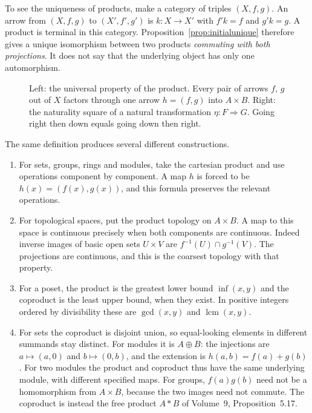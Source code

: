 To see the uniqueness of products, make a category of triples $(X,f,g)$. An arrow from $(X,f,g)$ to $(X',f',g')$ is $k:X\to X'$ with $f'k=f$ and $g'k=g$. A product is terminal in this category. Proposition~\ref{prop:initialunique} therefore gives a unique isomorphism between two products \emph{commuting with both projections}. It does not say that the underlying object has only one automorphism.

\begin{figure}[ht]
\centering
{}
\caption{Left: the universal property of the product. Every pair of arrows $f$, $g$ out of $X$ factors through one arrow $h=(f,g)$ into $A\times B$. Right: the naturality square of a
natural transformation $\eta\colon F\Rightarrow G$. Going right then down equals going down then right.}
\label{fig:universal}
\end{figure}

\begin{example}\label{ex:products}
The same definition produces several different constructions.
\begin{enumerate}[label=(\alph*)]
\item For sets, groups, rings and modules, take the cartesian product and use operations component by component. A map $h$ is forced to be $h(x)=(f(x),g(x))$, and this formula preserves the relevant operations.
\item For topological spaces, put the product topology on $A\times B$. A map to this space is continuous precisely when both components are continuous. Indeed inverse images of basic open sets $U\times V$ are $f^{-1}(U)\cap g^{-1}(V)$. The projections are continuous, and this is the coarsest topology with that property.
\item For a poset, the product is the greatest lower bound $\inf(x,y)$ and the coproduct is the least upper bound, when they exist. In positive integers ordered by divisibility these are $\gcd(x,y)$ and $\operatorname{lcm}(x,y)$.
\item For sets the coproduct is disjoint union, so equal-looking elements in different summands stay distinct. For modules it is $A\oplus B$: the injections are $a\mapsto(a,0)$ and $b\mapsto(0,b)$, and the extension is $h(a,b)=f(a)+g(b)$. For two modules the product and coproduct thus have the same underlying module, with different specified maps. For groups, $f(a)g(b)$ need not be a homomorphism from $A\times B$, because the two images need not commute. The coproduct is instead the free product $A*B$ of Volume~9, Proposition~5.17.
\end{enumerate}
\end{example}


